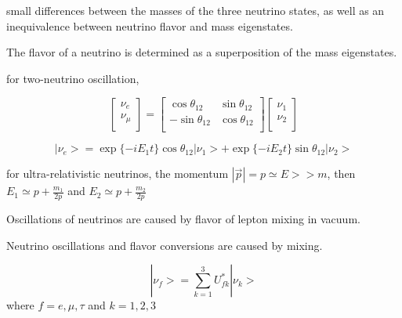 \documentclass[preprint,12pt]{elsarticle}
\begin{document}
small differences between the masses of the three neutrino states, as well as an
inequivalence between neutrino flavor and mass eigenstates.


The flavor of a neutrino is determined as a superposition of the mass eigenstates.

for two-neutrino oscillation, 

\[
\begin{bmatrix}
\nu_e\\
\nu_\mu\\
\end{bmatrix}
= \begin{bmatrix}
\cos\theta_{12} &\sin\theta_{12}\\
-\sin\theta_{12} &\cos\theta_{12}\\
\end{bmatrix}
\begin{bmatrix}
\nu_1\\
\nu_2\\
\end{bmatrix}
\]

\[
|\nu_e> = \exp\{-iE_1t\}\cos\theta_{12}|\nu_1>+\exp\{-iE_2t\}\sin\theta_{12}|\nu_2>
\]

for ultra-relativistic neutrinos, the momentum $|\vec{p}|=p\simeq E>>m$, then $E_1\simeq p+\frac{m_1}{2p}$ and $E_2\simeq p+\frac{m_2}{2p}$



Oscillations of neutrinos are caused by flavor of lepton mixing in vacuum.

Neutrino oscillations and flavor conversions are caused by mixing.

\[
|\nu_f> = \sum_{k=1}^3U^*_{fk}|\nu_k> 
\]
where $f=e,\mu,\tau$ and $k=1,2,3$
\end{document}

